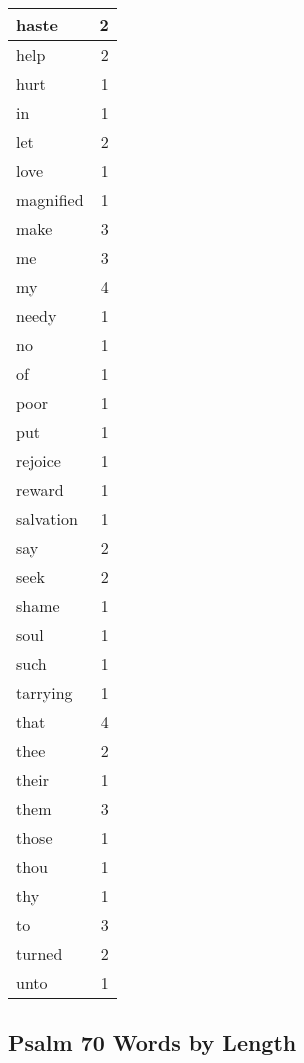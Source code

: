 \begin{center}
\begin{longtable}{l|r}
haste & 2\\ \hline 
help & 2\\ \hline 
hurt & 1\\ \hline 
in & 1\\ \hline 
let & 2\\ \hline 
love & 1\\ \hline 
magnified & 1\\ \hline 
make & 3\\ \hline 
me & 3\\ \hline 
my & 4\\ \hline 
needy & 1\\ \hline 
no & 1\\ \hline 
of & 1\\ \hline 
poor & 1\\ \hline 
put & 1\\ \hline 
rejoice & 1\\ \hline 
reward & 1\\ \hline 
salvation & 1\\ \hline 
say & 2\\ \hline 
seek & 2\\ \hline 
shame & 1\\ \hline 
soul & 1\\ \hline 
such & 1\\ \hline 
tarrying & 1\\ \hline 
that & 4\\ \hline 
thee & 2\\ \hline 
their & 1\\ \hline 
them & 3\\ \hline 
those & 1\\ \hline 
thou & 1\\ \hline 
thy & 1\\ \hline 
to & 3\\ \hline 
turned & 2\\ \hline 
unto & 1\\ \hline 
\end{longtable}
\end{center}





\subsection{Psalm 70 Words by Length}


\normalsize
 
